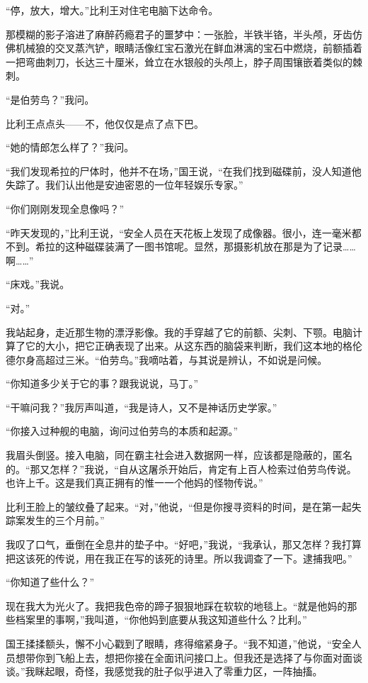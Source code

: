 \documentclass[AutoFakeBold=true]{book}
\begin{document}
``停，放大，增大。''比利王对住宅电脑下达命令。

那模糊的影子溶进了麻醉药瘾君子的噩梦中：一张脸，半铁半铬，半头颅，牙齿仿佛机械狼的交叉蒸汽铲，眼睛活像红宝石激光在鲜血淋漓的宝石中燃烧，前额插着一把弯曲刺刀，长达三十厘米，耸立在水银般的头颅上，脖子周围镶嵌着类似的棘刺。

``是伯劳鸟？''我问。

比利王点点头——不，他仅仅是点了点下巴。

``她的情郎怎么样了？''我问。

``我们发现希拉的尸体时，他并不在场，''国王说，``在我们找到磁碟前，没人知道他失踪了。我们认出他是安迪密恩的一位年轻娱乐专家。''

``你们刚刚发现全息像吗？''

``昨天发现的，''比利王说，``安全人员在天花板上发现了成像器。很小，连一毫米都不到。希拉的这种磁碟装满了一图书馆呢。显然，那摄影机放在那是为了记录……啊……''

``床戏。''我说。

``对。''

我站起身，走近那生物的漂浮影像。我的手穿越了它的前额、尖刺、下颚。电脑计算了它的大小，把它正确表现了出来。从这东西的脑袋来判断，我们这本地的格伦德尔身高超过三米。``伯劳鸟。''我嘀咕着，与其说是辨认，不如说是问候。

``你知道多少关于它的事？跟我说说，马丁。''

``干嘛问我？''我厉声叫道，``我是诗人，又不是神话历史学家。''

``你接入过种舰的电脑，询问过伯劳鸟的本质和起源。''

我眉头倒竖。接入电脑，同在霸主社会进入数据网一样，应该都是隐蔽的，匿名的。``那又怎样？''我说，``自从这屠杀开始后，肯定有上百人检索过伯劳鸟传说。也许上千。这是我们真正拥有的惟一一个他妈的怪物传说。''

比利王脸上的皱纹叠了起来。``对，''他说，``但是你搜寻资料的时间，是在第一起失踪案发生的三个月前。''

我叹了口气，垂倒在全息井的垫子中。``好吧，''我说，``我承认，那又怎样？我打算把这该死的传说，用在我正在写的该死的诗里。所以我调查了一下。逮捕我吧。''

``你知道了些什么？''

现在我大为光火了。我把我色帝的蹄子狠狠地踩在软软的地毯上。``就是他妈的那些档案里的事啊，''我叫道，``你他妈到底要从我这知道些什么？比利。''

国王揉揉额头，懈不小心戳到了眼睛，疼得缩紧身子。``我不知道，''他说，``安全人员想带你到飞船上去，想把你接在全面讯问接口上。但我还是选择了与你面对面谈谈。''我眯起眼，奇怪，我感觉我的肚子似乎进入了零重力区，一阵抽搐。
\end{document}

